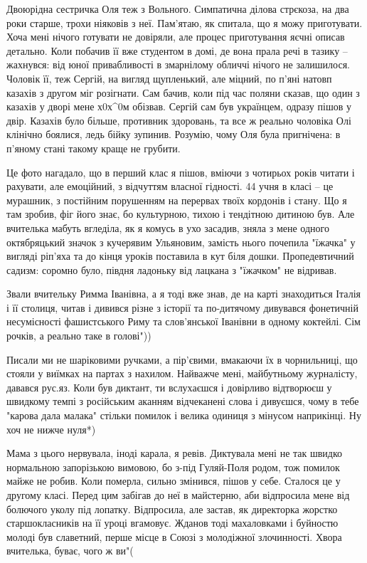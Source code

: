 Двоюрідна сестричка Оля теж з Вольного. Симпатична ділова стрєкоза, на два роки
старше, трохи ніяковів з неї. Пам'ятаю, як спитала, що я можу приготувати. Хоча
мені нічого готувати не довіряли, але процес приготування яєчні описав
детально. Коли побачив її вже студентом в домі, де вона прала речі в тазику –
жахнувся: від юної привабливості в змарнілому обличчі нічого не залишилося.
Чоловік її, теж Сергій, на вигляд щупленький, але міцний, по п'яні натовп
казахів з другом міг розігнати. Сам бачив, коли під час поляни сказав, що один
з казахів у дворі мене х0х^0м обізвав. Сергій сам був українцем, одразу пішов у
двір. Казахів було більше, противник здоровань, та все ж реально чоловіка Олі
клінічно боялися, ледь бійку зупинив. Розумію, чому Оля була пригнічена: в
п'яному стані такому краще не грубити.

Це фото нагадало, що в перший клас я пішов, вміючи з чотирьох років читати і
рахувати, але емоційний, з відчуттям власної гідності. 44 учня в класі – це
мурашник, з постійним порушенням на перервах твоїх кордонів і стану. Що я там
зробив, фіг його знає, бо культурною, тихою і тендітною дитиною був. Але
вчителька мабуть вгледіла, як я комусь в ухо засадив, зняла з мене одного
октябряцький значок з кучерявим Ульяновим, замість нього почепила "їжачка" у
вигляді ріп'яха та до кінця уроків поставила в кут біля дошки. Пропедевтичний
садизм: соромно було, півдня ладоньку від лацкана з "їжачком" не відривав. 

Звали вчительку Римма Іванівна, а я тоді вже знав, де на карті знаходиться
Італія і її столиця, читав і дивився різне з історії та по-дитячому дивувався
фонетичній несумісності фашистського Риму та слов'янської Іванівни в одному
коктейлі. Сім рочків, а реально таке в голові"))

Писали ми не шаріковими ручками, а пір'євими, вмакаючи їх в чорнильниці, що
стояли у виїмках на партах з нахилом. Найважче мені, майбутньому журналісту,
давався рус.яз. Коли був диктант, ти вслухаєшся і довірливо відтворюєш у
швидкому темпі з російським аканням відчеканені слова і дивуєшся, чому в тебе
"карова дала малака" стільки помилок і велика одиниця з мінусом наприкінці. Ну
хоч не нижче нуля*) 

Мама з цього нервувала, іноді карала, я ревів. Диктувала мені не так швидко
нормальною запорізькою вимовою, бо з-під Гуляй-Поля родом, тож помилок майже не
робив. Коли померла, сильно змінився, пішов у себе. Сталося це у другому класі.
Перед цим забігав до неї в майстерню, аби відпросила мене від болючого уколу
під лопатку. Відпросила, але застав, як директорка жорстко старшокласників на
її уроці вгамовує. Жданов тоді махаловками і буйностю молоді був славетний,
перше місце в Союзі з молодіжної злочинності. Хвора вчителька, буває, чого ж
ви"(

